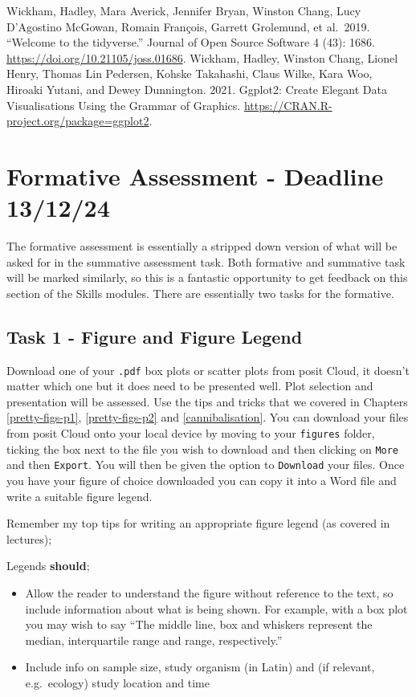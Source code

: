 \documentclass[
]{book}
\providecommand{\tightlist}{%
  \setlength{\itemsep}{0pt}\setlength{\parskip}{0pt}}
\begin{document}
Wickham, Hadley, Mara Averick, Jennifer Bryan, Winston Chang, Lucy D'Agostino McGowan, Romain François, Garrett Grolemund, et al.~2019. ``Welcome to the tidyverse.'' Journal of Open Source Software 4 (43): 1686. \url{https://doi.org/10.21105/joss.01686}.
Wickham, Hadley, Winston Chang, Lionel Henry, Thomas Lin Pedersen, Kohske Takahashi, Claus Wilke, Kara Woo, Hiroaki Yutani, and Dewey Dunnington. 2021. Ggplot2: Create Elegant Data Visualisations Using the Grammar of Graphics. \url{https://CRAN.R-project.org/package=ggplot2}.

\chapter{Formative Assessment - Deadline 13/12/24}\label{formative}

The formative assessment is essentially a stripped down version of what will be asked for in the summative assessment task. Both formative and summative task will be marked similarly, so this is a fantastic opportunity to get feedback on this section of the Skills modules. There are essentially two tasks for the formative.

\section{Task 1 - Figure and Figure Legend}\label{task-1}

Download one of your \texttt{.pdf} box plots or scatter plots from posit Cloud, it doesn't matter which one but it does need to be presented well. Plot selection and presentation will be assessed. Use the tips and tricks that we covered in Chapters \ref{pretty-figs-p1}, \ref{pretty-figs-p2} and \ref{cannibalisation}. You can download your files from posit Cloud onto your local device by moving to your \texttt{figures} folder, ticking the box next to the file you wish to download and then clicking on \texttt{More} and then \texttt{Export}. You will then be given the option to \texttt{Download} your files. Once you have your figure of choice downloaded you can copy it into a Word file and write a suitable figure legend.

Remember my top tips for writing an appropriate figure legend (as covered in lectures);

Legends \textbf{should};

\begin{itemize}
\tightlist
\item
  Allow the reader to understand the figure without reference to the text, so include information about what is being shown. For example, with a box plot you may wish to say ``The middle line, box and whiskers represent the median, interquartile range and range, respectively.''
\item
  Include info on sample size, study organism (in Latin) and (if relevant, e.g.~ecology) study location and time
\end{itemize}
\end{document}
